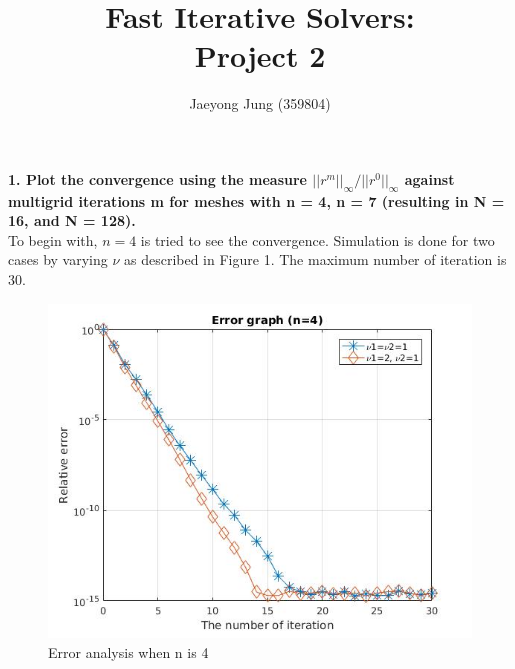 \documentclass[12pt]{article}
\begin{document}
 
 
\title{\textbf{Fast Iterative Solvers: \\Project 2}}

\author{Jaeyong Jung (359804)}
\maketitle

\newpage


\FloatBarrier

\textbf{1. Plot the convergence using the measure $||r^{m} ||_{\infty} /||r^{0}||_{\infty}$ against multigrid iterations m for meshes with n = 4, n = 7 (resulting in N = 16, and N = 128).}
\\

To begin with, $n=4$ is tried to see the convergence. Simulation is done for two cases by varying $\nu$ as described in Figure 1. The maximum number of iteration is 30.


\begin{figure}[H]
\centering
\includegraphics[scale=0.7]{err.jpg}
\caption{Error analysis when n is 4}
\end{figure}
\end{document}
